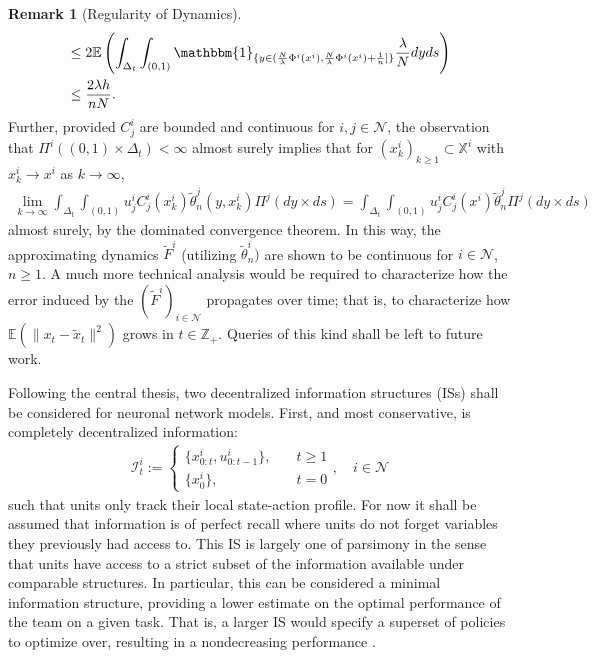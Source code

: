 \documentclass[12pt, oneside]{report}
\newcommand{\E}{\mathbb{E}}
\newcommand{\mbb}[1]{\mathbb{#1}}
\newcommand{\1}[1]{\mathbbm{1}_{\{#1\}}}
\newcommand{\mc}[1]{\mathcal{#1}}
\theoremstyle{definition}
\newtheorem{remark}[theorem]{Remark}
\begin{document}
\begin{remark}[Regularity of Dynamics]
\begin{align}
        &\leq 2\E\left(\int_{\Delta_t}\int_{(0,1)}\1{y\in(\frac{N}{\lambda}\Phi^i(x^i),\frac{N}{\lambda}\Phi^i(x^i)+\frac{1}{n}]}\frac{\lambda}{N}dyds\right)\notag{}\\
        &\leq \frac{2\lambda h}{nN}\notag.
    \end{align}
    Further, provided $C^i_j$ are bounded and continuous for $i,j\in\mc{N}$, the observation that $\Pi^i((0,1)\times\Delta_t)<\infty$ almost surely implies that for $(x^i_k)_{k\geq 1}\subset\mbb{X}^i$ with $x^i_k\rightarrow x^i$ as $k\rightarrow\infty$,
    \begin{align*}
        \lim_{k\rightarrow\infty}\int_{\Delta_t}\int_{(0,1)}u^i_jC^i_j(x^i_k)\tilde{\theta}^{j}_n(y,x^i_k)\Pi^j(dy\times ds)=\int_{\Delta_t}\int_{(0,1)}u^i_jC^i_j(x^i)\tilde{\theta}^j_n\Pi^j(dy\times ds)
    \end{align*}
    almost surely, by the dominated convergence theorem. In this way, the approximating dynamics $\tilde{F}^i$ (utilizing $\tilde{\theta}^i_n)$ are shown to be continuous for $i\in\mc{N}$, $n\geq 1$. A much more
    technical analysis would be required to characterize how the error induced by the $(\tilde{F}^i)_{i\in\mc{N}}$ propagates over time; that is, to characterize how
    $\E(\|x_t-\tilde{x}_t\|^2)$ grows in $t\in\mbb{Z}_+$. Queries of this kind shall be left to future work.
\end{remark}
\indent Following the central thesis, two decentralized information structures (ISs) shall be considered for
neuronal network models. First, and most conservative, is completely decentralized
information:
\begin{align}
    \mc{I}^i_t:=\begin{cases}
        \{x^i_{0:t},u^i_{0:t-1}\},\quad&\text{$t\geq 1$}\\
        \{x^i_0\},\quad&\text{$t=0$}
    \end{cases},\quad i\in\mc{N}\label{eq58}
\end{align}
such that units only track their local state-action profile. For now it shall be
assumed that information is of perfect recall where units do not forget
variables they previously had access to. This IS is largely one of parsimony in
the sense that units have access to a strict subset of the information available
under comparable structures. In particular, this can be considered a minimal information structure, providing a lower estimate on
the optimal performance of the team on a given task. That is, a larger IS would specify a superset of policies to optimize over, resulting in a nondecreasing performance \cite[\S7.2, proposition 7.2.1]{Yuksel_Basar_2024}.
\end{document}
